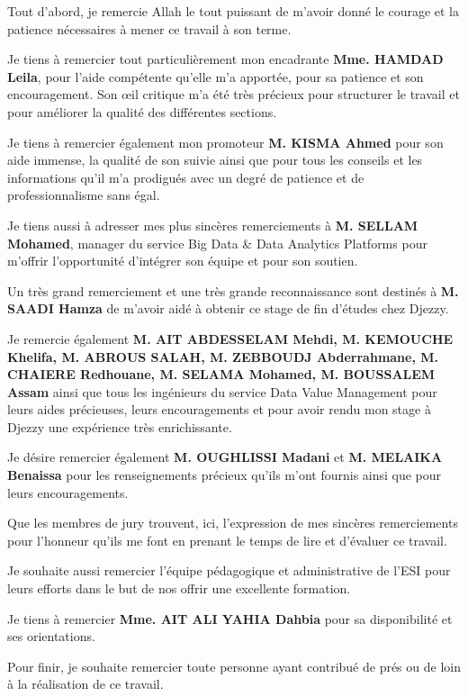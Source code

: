 
Tout d'abord, je remercie Allah le tout puissant de m'avoir donné le courage et la patience nécessaires à mener ce travail à son terme.

Je tiens à remercier tout particulièrement mon encadrante \textbf{Mme. HAMDAD Leila}, pour l’aide compétente qu’elle m’a apportée, pour sa patience et son encouragement. Son œil critique m’a été très précieux pour structurer le travail et pour améliorer la qualité des différentes sections.

Je tiens à remercier également mon promoteur \textbf{M. KISMA Ahmed} pour son aide immense, la qualité de son suivie ainsi que pour tous les conseils et les informations qu'il m’a prodigués avec un degré de patience et de professionnalisme sans égal.

Je tiens aussi à adresser mes plus sincères remerciements à \textbf{M. SELLAM Mohamed}, manager du service Big Data \& Data Analytics Platforms pour m'offrir l'opportunité d'intégrer son équipe et pour son soutien.

Un très grand remerciement et une très grande reconnaissance sont destinés à \textbf{M. SAADI Hamza} de m'avoir aidé à obtenir ce stage de fin d'études chez Djezzy.

Je remercie également \textbf{M. AIT ABDESSELAM Mehdi, M. KEMOUCHE Khelifa, M. ABROUS SALAH, M. ZEBBOUDJ Abderrahmane, M. CHAIERE Redhouane, M. SELAMA Mohamed, M. BOUSSALEM Assam} ainsi que tous les ingénieurs du service Data Value Management pour leurs aides précieuses, leurs encouragements et pour avoir rendu mon stage à Djezzy une expérience très enrichissante.

Je désire remercier également \textbf{M. OUGHLISSI Madani} et \textbf{M. MELAIKA Benaissa} pour les renseignements précieux qu’ils m'ont fournis ainsi que pour leurs encouragements.

Que les membres de jury trouvent, ici, l'expression de mes sincères remerciements pour l'honneur qu'ils me font en prenant le temps de lire et d'évaluer ce travail.

Je souhaite aussi remercier l'équipe pédagogique et administrative de l'ESI pour leurs efforts dans le but de nos offrir une excellente formation.

Je tiens à remercier \textbf{Mme. AIT ALI YAHIA Dahbia} pour sa disponibilité et ses orientations.

Pour finir, je souhaite remercier toute personne ayant contribué de prés ou de loin à la réalisation de ce travail.






\clearpage